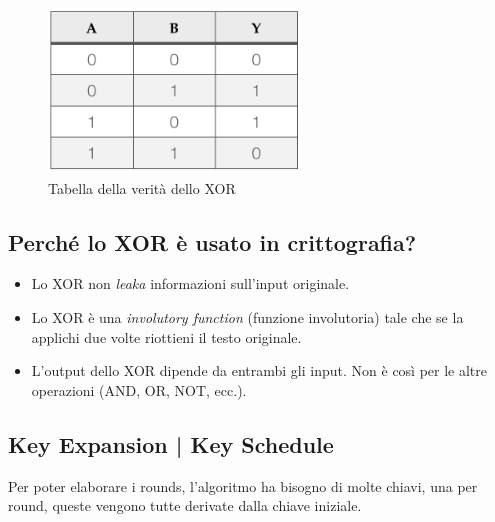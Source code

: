 \begin{figure}[H]
	\centering
	\includegraphics[width=0.6\textwidth, height=0.6\textheight, keepaspectratio]{./images/XOR/XOR-Truth-Table.png}
	\caption{Tabella della verità dello XOR}
	\label{fig:xor_truth_table}
\end{figure}

\subsection{Perché lo XOR è usato in crittografia?}

\begin{itemize}
	\item \textsf{\small Lo XOR non \emph{leaka} informazioni sull'input originale.} %
	\item \textsf{\small Lo XOR è una \emph{involutory function} (funzione involutoria) tale che se la applichi due volte riottieni il testo originale.}
	\item \textsf{\small L'output dello XOR dipende da entrambi gli input. Non è così per le altre operazioni (AND, OR, NOT, ecc.).}
\end{itemize}

\fleuron


\subsection{Key Expansion | Key Schedule} %

\textsf{\small Per poter elaborare i rounds, l'algoritmo ha bisogno di molte chiavi, una per round, queste vengono tutte derivate dalla chiave iniziale.}


